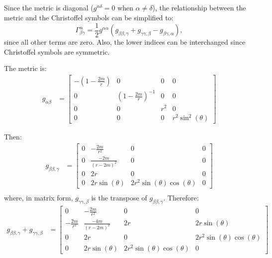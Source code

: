 \documentclass[a4paper]{article}
\begin{document}
\subsection{}
Since the metric is diagonal ($g^{\alpha \delta} = 0$ when $\alpha \ne \delta$), the relationship between the metric and the Christoffel symbols can be simplified to:
$$\Gamma^\alpha_{\beta \gamma} = \frac{1}{2} g^{\alpha \alpha}(g_{\beta \beta , \gamma} + g_{\gamma \gamma , \beta} - g_{\beta \gamma , \alpha}), $$
since all other terms are zero. 
Also, the lower indices can be interchanged since Christoffel symbols are symmetric.

The metric is:
\begin{align*}
	g_{\alpha\beta} &= \begin{bmatrix} -\left(1-\frac{2m}{r}\right) & 0 & 0 & 0 \\
		0 & \left( 1 - \frac{2m}{r} \right)^{-1} & 0 & 0\\
		0 & 0 & r^2 & 0 \\
		0 & 0 & 0 & r^2 \sin^2(\theta)
	\end{bmatrix}
\end{align*}

Then:
\begin{align*}
g_{\beta \beta, \gamma} &= \begin{bmatrix} 0 & -\frac{2m}{r^2}  & 0 & 0 \\
			0 &\frac{-2m}{(r-2m)^2} & 0 & 0\\
			0 & 2r & 0 & 0 \\
			0 & 2r\sin(\theta) & 2r^2 \sin(\theta) \cos(\theta) & 0
		\end{bmatrix}\\
\end{align*}
where, in matrix form, $g_{\gamma \gamma, \beta}$ is the transpose of $g_{\beta \beta, \gamma}$.
Therefore:
\begin{align*}
g_{\beta \beta, \gamma} + g_{\gamma \gamma, \beta} &= \begin{bmatrix} 0 & -\frac{2m}{r^2}  & 0 & 0 \\
	-\frac{2m}{r^2} &\frac{-4m}{(r-2m)^2} & 2r & 2r\sin(\theta)\\
	0 & 2r & 0 & 2r^2 \sin(\theta) \cos(\theta) \\
	0 & 2r\sin(\theta) & 2r^2 \sin(\theta) \cos(\theta) & 0
\end{bmatrix}
\end{align*}
\end{document}
